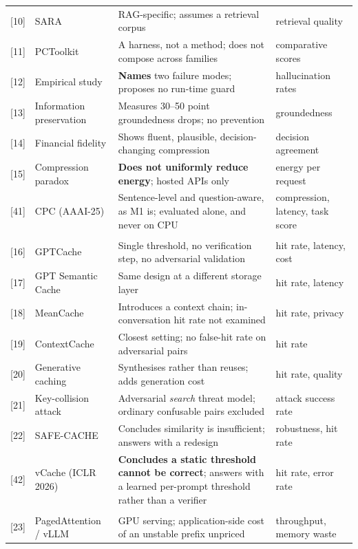 \documentclass[11pt,a4paper]{article}
\begin{document}
\begin{table}[htbp]
\begin{tabularx}{\textwidth}{@{}l L{3.0cm} X l@{}}
{[10]} & SARA & RAG-specific; assumes a retrieval corpus & retrieval quality \\
{[11]} & PCToolkit & A harness, not a method; does not compose across families & comparative scores \\
{[12]} & Empirical study & \textbf{Names} two failure modes; proposes no run-time guard & hallucination rates \\
{[13]} & Information preservation & Measures 30--50 point groundedness drops; no prevention & groundedness \\
{[14]} & Financial fidelity & Shows fluent, plausible, decision-changing compression & decision agreement \\
{[15]} & Compression paradox & \textbf{Does not uniformly reduce energy}; hosted APIs only & energy per request \\
{[41]} & CPC (AAAI-25) & Sentence-level and question-aware, as M1 is; evaluated alone, and never on CPU & compression, latency, task score \\
\addlinespace
{}\\
{[16]} & GPTCache & Single threshold, no verification step, no adversarial validation & hit rate, latency, cost \\
{[17]} & GPT Semantic Cache & Same design at a different storage layer & hit rate, latency \\
{[18]} & MeanCache & Introduces a context chain; in-conversation hit rate not examined & hit rate, privacy \\
{[19]} & ContextCache & Closest setting; no false-hit rate on adversarial pairs & hit rate \\
{[20]} & Generative caching & Synthesises rather than reuses; adds generation cost & hit rate, quality \\
{[21]} & Key-collision attack & Adversarial \emph{search} threat model; ordinary confusable pairs excluded & attack success rate \\
{[22]} & SAFE-CACHE & Concludes similarity is insufficient; answers with a redesign & robustness, hit rate \\
{[42]} & vCache (ICLR 2026) & \textbf{Concludes a static threshold cannot be correct}; answers with a learned per-prompt threshold rather than a verifier & hit rate, error rate \\
\addlinespace
{}\\
{[23]} & PagedAttention / vLLM & GPU serving; application-side cost of an unstable prefix unpriced & throughput, memory waste \\

\end{tabularx}
\end{table}
\end{document}
